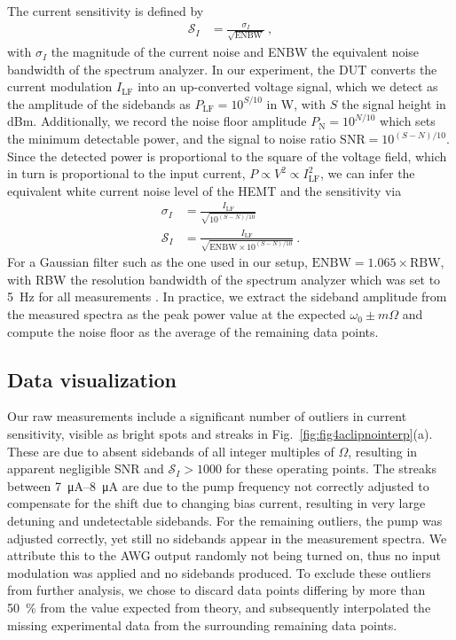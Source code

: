 % 
The current sensitivity is defined by
% 
\begin{align}
\mathcal{S}_I & = \frac{\sigma_I}{\sqrt{\text{ENBW}}}\ ,
\end{align}
% 
with $\sigma_I$ the magnitude of the current noise and ENBW the equivalent noise bandwidth of the spectrum analyzer.
% 
In our experiment, the DUT converts the current modulation $I_\text{LF}$ into an up-converted voltage signal, which we detect as the amplitude of the sidebands as $P_\text{LF}=10^{S/10}$ in \si{\watt}, with $S$ the signal height in \si{dBm}.
% 
Additionally, we record the noise floor amplitude $P_\text{N}=10^{N/10}$ which sets the minimum detectable power, and the signal to noise ratio $\text{SNR}=10^{(S-N)/10}$.
% 
Since the detected power is proportional to the square of the voltage field, which in turn is proportional to the input current, $P \propto V^2 \propto I_\text{LF}^2$, we can infer the equivalent white current noise level of the HEMT and the sensitivity via
% 
\begin{align}
\sigma_I &= \frac{I_\text{LF}}{\sqrt{10^{(S-N)/10}}} \\
\mathcal{S}_I &= \frac{I_\text{LF}}{\sqrt{\text{ENBW}\times10^{(S-N)/10}}}\ .
\end{align}
% 
For a Gaussian filter such as the one used in our setup, $\text{ENBW}=1.065 \times \text{RBW}$, with RBW the resolution bandwidth of the spectrum analyzer which was set to \SI{5}{\hertz} for all measurements \cite{rauscherFundamentalsSpectrumAnalysis2016a}.
% 
In practice, we extract the sideband amplitude from the measured spectra as the peak power value at the expected $\omega_0 \pm m\Omega$ and compute the noise floor as the average of the remaining data points.

\subsection{Data visualization}

Our raw measurements include a significant number of outliers in current sensitivity, visible as bright spots and streaks in Fig.~\ref{fig:fig4aclipnointerp}(a).
% 
These are due to absent sidebands of all integer multiples of $\Omega$, resulting in apparent negligible SNR and $\mathcal{S}_I > 1000$ for these operating points.
% 
The streaks between \SIrange{7}{8}{\micro\ampere} are due to the pump frequency not correctly adjusted to compensate for the shift due to changing bias current, resulting in very large detuning and undetectable sidebands.
% 
For the remaining outliers, the pump was adjusted correctly, yet still no sidebands appear in the measurement spectra.
%
We attribute this to the AWG output randomly not being turned on, thus no input modulation was applied and no sidebands produced.
% 
To exclude these outliers from further analysis, we chose to discard data points differing by more than \SI{50}{\percent} from the value expected from theory, and subsequently interpolated the missing experimental data from the surrounding remaining data points.

